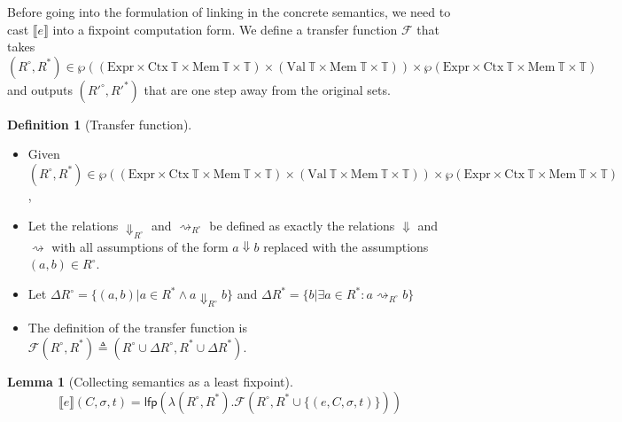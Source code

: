 \documentclass{article}
\theoremstyle{definition}
\newtheorem{definition}{Definition}[section]
\newtheorem{lem}{Lemma}[section]
\newcommand*{\Expr}{\text{Expr}}
\newcommand*{\Time}{\mathbb{T}}
\newcommand*{\Ctx}[1]{\text{Ctx}\:{#1}}
\newcommand*{\Value}[1]{\text{Val}\:{#1}}
\newcommand*{\Mem}[1]{\text{Mem}\:{#1}}
\newcommand*{\sembracket}[1]{\lBrack{#1}\rBrack}
\begin{document}
Before going into the formulation of linking in the concrete semantics, we need to cast $\sembracket{e}$ into a fixpoint computation form.
We define a transfer function $\mathcal{F}$ that takes $(R^{\circ},R^{*})\in\wp((\Expr\times\Ctx{\Time}\times\Mem{\Time}\times\Time)\times(\Value{\Time}\times\Mem{\Time}\times\Time))\times\wp(\Expr\times\Ctx{\Time}\times\Mem{\Time}\times\Time)$ and outputs $({R'}^{\circ},{R'}^{*})$ that are one step away from the original sets.
\begin{definition}[Transfer function]
  $\:$

  \begin{itemize}
    \item Given $(R^{\circ},R^{*})\in\wp((\Expr\times\Ctx{\Time}\times\Mem{\Time}\times\Time)\times(\Value{\Time}\times\Mem{\Time}\times\Time))\times\wp(\Expr\times\Ctx{\Time}\times\Mem{\Time}\times\Time)$,
    \item Let the relations $\Downarrow_{R^{\circ}}$ and $\rightsquigarrow_{R^{\circ}}$ be defined as exactly the relations $\Downarrow$ and $\rightsquigarrow$ with all assumptions of the form $a\Downarrow b$ replaced with the assumptions $(a,b)\in R^{\circ}$.
    \item Let $\Delta R^{\circ}=\{(a,b)|a\in R^{*}\wedge a\Downarrow_{R^{\circ}}b\}$ and $\Delta R^{*}=\{b|\exists a\in R^{*}:a\rightsquigarrow_{R^{\circ}}b\}$
    \item The definition of the transfer function is $\mathcal{F}(R^{\circ},R^{*})\triangleq(R^{\circ}\cup\Delta R^{\circ}, R^{*}\cup\Delta R^{*})$.
  \end{itemize}
\end{definition}

\begin{lem}[Collecting semantics as a least fixpoint]
  \[
    \sembracket{e}(C,\sigma,t)=\mathsf{lfp}(\lambda (R^{\circ}, R^{*}).\mathcal{F}(R^{\circ}, R^{*}\cup\{(e,C,\sigma,t)\}))
  \]
\end{lem}
\end{document}
